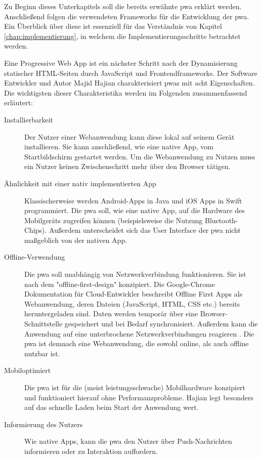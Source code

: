 Zu Beginn dieses Unterkapitels soll die bereits erwähnte \acf{pwa} erklärt werden. Anschließend folgen die verwendeten Frameworks für die Entwicklung der \ac{pwa}. Ein Überblick über diese ist essenziell für das Verständnis von Kapitel \ref{chap:implementierung}, in welchem die Implementierungsschritte betrachtet werden.

Eine Progressive Web App ist ein nächster Schritt nach der Dynamisierung statischer HTML-Seiten durch JavaScript und Frontendframeworks. Der Software Entwickler und Autor Majid Hajian charakterisiert \ac{pwa}s mit acht Eigenschaften. Die wichtigsten dieser Charakteristika werden im Folgenden zusammenfassend erläutert:


\begin{description}
  \item [Installierbarkeit]
	  Der Nutzer einer Webanwendung kann diese lokal auf seinem Gerät installieren. Sie kann anschließend, wie eine native App, vom Startbildschirm gestartet werden. Um die Webanwendung zu Nutzen muss ein Nutzer keinen Zwischenschritt mehr über den Browser tätigen.
  
  \item [Ähnlichkeit mit einer nativ implementierten App]  
 	 Klassischerweise werden Android-Apps in Java und iOS Apps in Swift programmiert. Die \ac{pwa} soll, wie eine native App, auf die Hardware des Mobilgeräts zugreifen können (beispielsweise die Nutzung Bluetooth-Chips). Außerdem unterscheidet sich das User Interface der \ac{pwa} nicht maßgeblich von der nativen App. 
  
  \item [Offline-Verwendung] 
  	Die \ac{pwa} soll unabhängig von Netzwerkverbindung funktionieren. Sie ist nach dem "offline-first-design" konzipiert. Die Google-Chrome Dokumentation für Cloud-Entwickler beschreibt Offline First Apps als Webanwendung, deren Dateien (JavaScript, HTML, CSS etc.) bereits heruntergeladen sind. Daten werden temporär über eine Browser-Schnittstelle gespeichert und bei Bedarf synchronisiert. Außerdem kann die Anwendung auf eine unterbrochene Netzwerkverbindungen reagieren \cite{GoogleOfflineApps}. Die \ac{pwa} ist demnach eine Webanwendung, die sowohl online, als auch offline nutzbar ist.

  \item [Mobiloptimiert]  
  	Die \ac{pwa} ist für die (meist leistungsschwache) Mobilhardware konzipiert und funktioniert hierauf ohne Performanzprobleme. Hajian legt besonders auf das schnelle Laden beim Start der Anwendung wert.
  	
  \item [Informierung des Nutzers] 
  	Wie native Apps, kann die \ac{pwa} den Nutzer über Push-Nachrichten informieren oder zu Interaktion auffordern.
\end{description}

